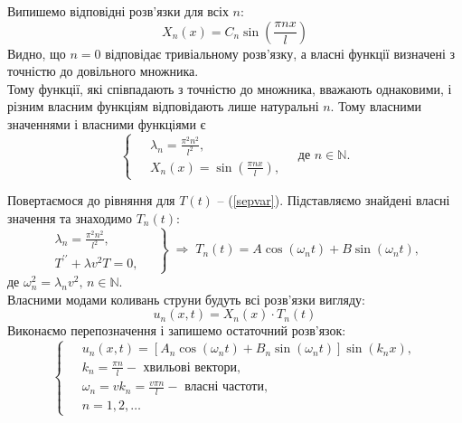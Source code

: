 \documentclass[a4paper, 14pt]{extreport}
\begin{document}
Випишемо відповідні розв'язки для всіх $n$:
    \begin{equation*}
        X_n(x) = C_n \sin\left(\frac{\pi n x}{l}\right)
    \end{equation*}
    Видно, що $n = 0$ відповідає тривіальному розв'язку, а власні функції визначені з точністю до довільного множника.\\
    Тому функції, які співпадають з точністю до множника, вважають однаковими, і різним власним функціям відповідають лише натуральні $n$. Тому власними значеннями і власними функціями є
    \begin{equation} \label{ShLsol}
        \left\{ \begin{aligned}
            \;&\lambda_n = \frac{\pi^2 n^2}{l^2},\\ 
            &X_n(x) = \sin\left(\frac{\pi n x}{l}\right),
        \end{aligned} \right.
        \quad \text{де } n \in \mathbb{N}.
    \end{equation}

Повертаємося до рівняння для $T(t)$ -- (\ref{sepvar}). Підставляємо знайдені власні значення та знаходимо $T_n(t)$:
\begin{equation*}
    \left. \begin{aligned}
        \lambda_n = \frac{\pi^2 n^2}{l^2},&\;\\ 
        T^{\prime\prime} + \lambda v^2T = 0,&
    \end{aligned} \right\}
    \;\Rightarrow\;
    T_n(t) = A\cos(\omega_n t) + B\sin(\omega_n t),
\end{equation*}
де $\omega_n^2 = \lambda_n v^2, \, n \in \mathbb{N}.$\\
Власними модами коливань струни будуть всі розв'язки вигляду:
\begin{equation*}
    u_n(x,t) = X_n(x) \cdot T_n(t)
\end{equation*}
Виконаємо перепозначення і запишемо остаточний розв'язок:
\begin{equation}
    \left\{ \begin{aligned} \label{fullsol}
        \;&u_n(x,t) = \left[A_n\cos(\omega_n t) + B_n\sin(\omega_n t)\right] \sin(k_n x), \\
        &k_n = \frac{\pi n}{l} - \text{ хвильові вектори}, \\
        &\omega_n = vk_n = \frac{v \pi n}{l} - \text{ власні частоти}, \\
        &n = 1, 2,\ldots
    \end{aligned}\right.
\end{equation}
\end{document}
